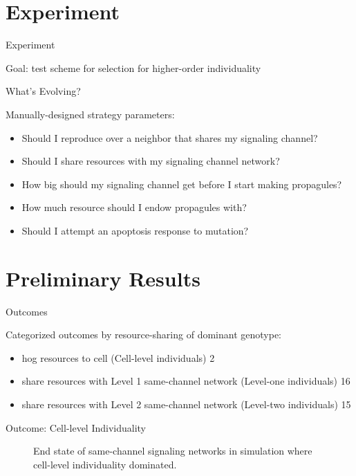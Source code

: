 \section{Experiment}

\begin{frame}{Experiment}

Goal: test scheme for selection for higher-order individuality

\end{frame}

\begin{frame}{What's Evolving?}

Manually-designed strategy parameters:
\begin{itemize}
\item Should I reproduce over a neighbor that shares my signaling channel?
\item Should I share resources with my signaling channel network?
\item How big should my signaling channel get before I start making propagules?
\item How much resource should I endow propagules with?
\item Should I attempt an apoptosis response to mutation?
\end{itemize}
\end{frame}

\section{Preliminary Results}


\begin{frame}{Outcomes}

Categorized outcomes by resource-sharing of dominant genotype:
\begin{itemize}
\item hog resources to cell (Cell-level individuals) 2
\item share resources with Level 1 same-channel network (Level-one individuals) 16
\item share resources with Level 2 same-channel network (Level-two individuals) 15
\end{itemize}

\end{frame}

\begin{frame}{Outcome: Cell-level Individuality}
\begin{figure}
\begin{columns}
\begin{column}{0.6\textwidth}
\end{column}
\begin{column}{0.4\textwidth}
\caption{
End state of same-channel signaling networks in simulation where cell-level individuality dominated.
}
\end{column}
\end{columns}
\end{figure}
\end{frame}

